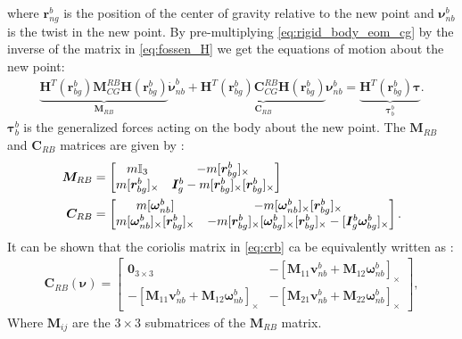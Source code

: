 where $\bm{r}_{ng}^{b}$ is the position of the center of gravity relative to the
new point and $\bm{\nu}_{nb}^{b}$ is the twist in the new point. By
pre-multiplying \autoref{eq:rigid_body_eom_cg} by the inverse of the matrix
in \autoref{eq:fossen_H} we get the equations of motion about the new point:
\begin{align}
    \underbrace{
        \bm{H}^T(\bm{r}_{bg}^b) \bm{M}_{CG}^{RB} \bm{H}(\bm{r}_{bg}^b)
    }_{\bm{M}_{RB}}
    \dot{\bm{\nu}}_{nb}^b
    + \underbrace{
        \bm{H}^T(\bm{r}_{bg}^b) \bm{C}_{CG}^{RB} \bm{H}(\bm{r}_{bg}^b)
    }_{\bm{C}_{RB}}
    \bm{\nu}_{nb}^b
    = \underbrace{
        \bm{H}^T(\bm{r}_{bg}^b)
    \bm{\tau}
    }_{\bm{\tau}_{b}^b}.
\end{align}
$\bm{\tau}_{b}^b$ is the generalized forces acting on the body about the new
point. The $\bm{M}_{RB}$ and $\bm{C}_{RB}$ matrices are given by \cite{fossen2021}:
\begin{subequations}
\begin{align}
    \bm{M}_{RB} &= \begin{bmatrix}
        m \mathbb{I}_3 & - m [\bm{r}_{bg}^b]_{\times} \\
        m [\bm{r}_{bg}^b]_{\times} & \bm{I}_g^b - m [\bm{r}_{bg}^b]_{\times}[\bm{r}_{bg}^b]_{\times}
    \end{bmatrix} \\
    \bm{C}_{RB} &= \begin{bmatrix}
        m [\bm{\omega}_{nb}^b] & -m [\bm{\omega}_{nb}^b]_{\times}[\bm{r}_{bg}^b]_{\times} \\
        m [\bm{\omega}_{nb}^b]_{\times}[\bm{r}_{bg}^b]_{\times} & 
        -m [ \bm{r}_{bg}^b ]_{\times} [ \bm{\omega}_{bg}^b ]_{\times} [ \bm{r}_{bg}^b ]_{\times} -
        [ \bm{I}_g^b \bm{\omega}_{bg}^b ]_{\times}
    \end{bmatrix}. \label{eq:crb}
\end{align}
\end{subequations}
It can be shown that the coriolis matrix in \autoref{eq:crb} ca be equivalently
written as \cite{sagatun1991}:
\begin{align}
    \bm{C}_{RB}(\bm\nu) = \begin{bmatrix}
        \bm{0}_{3 \times 3} & 
        -\left[\bm{M}_{11}\bm{v}_{nb}^{b} + \bm{M}_{12}\bm{\omega}_{nb}^b \right]_{\times} \\
        -\left[\bm{M}_{11}\bm{v}_{nb}^{b} + \bm{M}_{12}\bm{\omega}_{nb}^b \right]_{\times} &
        -\left[\bm{M}_{21}\bm{v}_{nb}^{b} + \bm{M}_{22}\bm{\omega}_{nb}^b \right]_{\times}
    \end{bmatrix},
\end{align}
Where $\bm{M}_{ij}$ are the $3 \times 3$ submatrices of the $\bm{M}_{RB}$ matrix.

